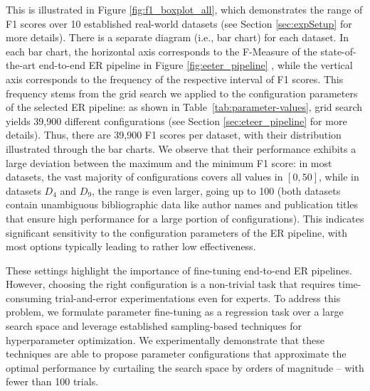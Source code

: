 This is illustrated in Figure \ref{fig:f1_boxplot_all}, which demonstrates the range of F1 scores over 10 established real-world datasets 
(see Section \ref{sec:expSetup} for more details). {There is a separate diagram (i.e., bar chart) for each dataset. In each bar chart, the horizontal axis corresponds to the F-Measure of 
the state-of-the-art end-to-end ER pipeline in Figure \ref{fig:eeter_pipeline} \cite{DBLP:journals/pvldb/ZeakisPSK23}, while the vertical axis corresponds to the frequency of the respective interval of F1 scores. This frequency stems from the grid search we applied to the configuration parameters of the selected ER pipeline: as shown in Table~\ref{tab:parameter-values}, grid search yields 39,900 different configurations (see Section \ref{sec:eteer_pipeline} for more details). Thus, there are 39,900 F1 scores per dataset, with their distribution illustrated through the bar charts.
We observe that} their performance exhibits a large deviation between the maximum and the minimum F1 score: 
in most datasets, the vast majority of configurations covers all values in $[0,50]$, while in datasets $D_4$ and $D_9$, the range is even larger, going up to 100 (both datasets contain unambiguous bibliographic data like author names and publication titles that ensure high performance for a large portion of configurations). This indicates significant sensitivity to the configuration parameters of the ER pipeline, with most options typically leading to rather low effectiveness. 

These settings highlight the importance of fine-tuning end-to-end ER pipelines. However, choosing the right configuration is a non-trivial task that requires time-consuming trial-and-error experimentations even for experts. To address this problem, we formulate parameter fine-tuning as a regression task over a large search space and leverage established sampling-based techniques for hyperparameter optimization. We experimentally demonstrate that these techniques are able to propose parameter configurations that approximate the optimal performance by curtailing the search space by orders of magnitude -- with fewer than 100 trials.

